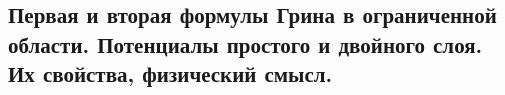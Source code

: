 \subsection{Первая и вторая формулы Грина в ограниченной области. Потенциалы простого и двойного слоя. Их свойства, физический смысл.}